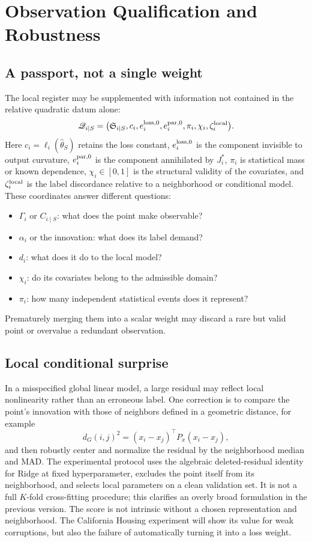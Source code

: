 \section{Observation Qualification and Robustness}
\subsection{A passport, not a single weight}
The local register may be supplemented with information not contained in the relative quadratic datum alone:
\begin{equation}
\mathscr Q_{i\mid S}
=
\bigl(
\mathfrak S_{i\mid S},
 c_i,
 e_i^{\rm loss,0},
 e_i^{\rm par,0},
\pi_i,
\chi_i,
\zeta_i^{\rm local}
\bigr).
\end{equation}
Here $c_i=\ell_i(\widehat\theta_S)$ retains the loss constant, $e_i^{\rm loss,0}$ is the component invisible to output curvature, $e_i^{\rm par,0}$ is the component annihilated by $J_i^*$, $\pi_i$ is statistical mass or known dependence, $\chi_i\in[0,1]$ is the structural validity of the covariates, and $\zeta_i^{\rm local}$ is the label discordance relative to a neighborhood or conditional model. These coordinates answer different questions:
\begin{itemize}
  \item $\Gamma_i$ or $C_{i\mid S}$: what does the point make observable?
  \item $\alpha_i$ or the innovation: what does its label demand?
  \item $d_i$: what does it do to the local model?
  \item $\chi_i$: do its covariates belong to the admissible domain?
  \item $\pi_i$: how many independent statistical events does it represent?
\end{itemize}
Prematurely merging them into a scalar weight may discard a rare but valid point or overvalue a redundant observation.

\subsection{Local conditional surprise}
In a misspecified global linear model, a large residual may reflect local nonlinearity rather than an erroneous label. One correction is to compare the point's innovation with those of neighbors defined in a geometric distance, for example
\begin{equation}
d_G(i,j)^2=(x_i-x_j)^\top P_x(x_i-x_j),
\end{equation}
and then robustly center and normalize the residual by the neighborhood median and MAD. The experimental protocol uses the algebraic deleted-residual identity for Ridge at fixed hyperparameter, excludes the point itself from its neighborhood, and selects local parameters on a clean validation set. It is not a full $K$-fold cross-fitting procedure; this clarifies an overly broad formulation in the previous version. The score is not intrinsic without a chosen representation and neighborhood. The California Housing experiment will show its value for weak corruptions, but also the failure of automatically turning it into a loss weight.

